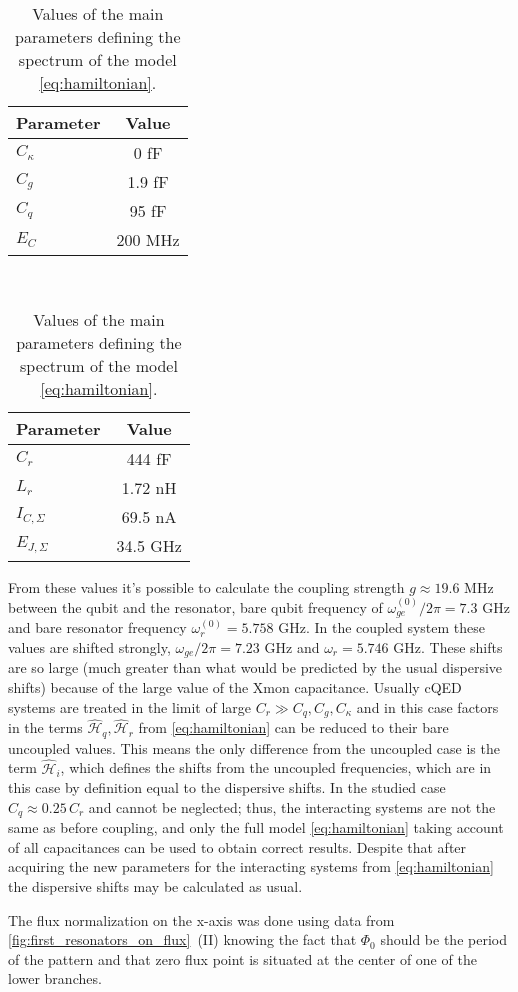 \documentclass[12pt, twoside]{report}
\numberwithin{equation}{section}
\begin{document}
\begin{table}[h]
\centering
\begin{tabular}{l|c}
Parameter & Value \\
\hline 
$C_\kappa$ & 0 fF \\
\hline
$C_g$ & 1.9 fF \\
\hline
$C_q$ & 95 fF \\
\hline
$E_C$ & 200 MHz
\end{tabular}~
\begin{tabular}{l|c}
Parameter & Value\\
\hline
$C_r$ & 444 fF \\
\hline
$L_r$ & 1.72 nH \\
\hline
$I_{C, \Sigma}$ & 69.5 nA \\
\hline
$E_{J, \Sigma}$ & 34.5 GHz
\end{tabular}
\caption{Values of the main parameters defining the spectrum of the model \eqref{eq:hamiltonian}.}
\label{tab:first_II_params}
\end{table}

From these values it's possible to calculate the coupling strength $g \approx 19.6$ MHz between the qubit and the resonator, bare qubit frequency of $\omega^{(0)}_{ge}/2\pi = 7.3$ GHz and bare resonator frequency $\omega^{(0)}_r = 5.758$ GHz. In the coupled system these values are shifted strongly, $\omega_{ge}/2\pi = 7.23$ GHz and $\omega_r = 5.746$ GHz. These shifts are so large (much greater than what would be predicted by the usual dispersive shifts) because of the large value of the Xmon capacitance. Usually cQED systems are treated in the limit of large $C_r \gg C_q, C_g, C_\kappa$ and in this case factors in the terms $\mathcal{\hat H}_q, \mathcal{\hat H}_r $ from \eqref{eq:hamiltonian} can be reduced to their bare uncoupled values. This means the only difference from the uncoupled case is the term $\mathcal{\hat H}_i$, which defines the shifts from the uncoupled frequencies, which are in this case by definition equal to the dispersive shifts. In the studied case $C_q \approx 0.25\, C_r$ and cannot be neglected; thus, the interacting systems are not the same as before coupling, and only the full model \eqref{eq:hamiltonian} taking account of all capacitances can be used to obtain correct results. Despite that after acquiring the new parameters for the interacting systems from \eqref{eq:hamiltonian} the dispersive shifts may be calculated as usual.

The flux normalization on the x-axis was done using data from \autoref{fig:first_resonators_on_flux}~(II) knowing the fact that $\Phi_0$ should be the period of the pattern and that zero flux point is situated at the center of one of the lower branches.
\end{document}
